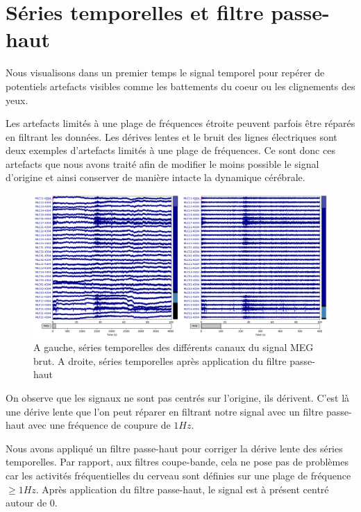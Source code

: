 \section{Séries temporelles et filtre passe-haut}

Nous visualisons dans un premier temps le signal temporel pour repérer de potentiels artefacts visibles comme les battements du coeur ou les clignements des yeux.

Les artefacts limités à une plage de fréquences étroite peuvent parfois être réparés en filtrant les données. Les dérives lentes et le bruit des lignes électriques sont deux exemples d'artefacts limités à une plage de fréquences. Ce sont donc ces artefacts que nous avons traité afin de modifier le moins possible le signal d'origine et ainsi conserver de manière intacte la dynamique cérébrale.

\begin{figure}[!ht]
    \centering
    \includegraphics[width=13cm]{series_temporelles_effet_hp.png}
    \caption{A gauche, séries temporelles des différents canaux du signal MEG brut. A droite, séries temporelles après application du filtre passe-haut}
    \label{fig3.3}
\end{figure} 

On observe que les signaux ne sont pas centrés sur l'origine, ils dérivent. C'est là une dérive lente que l'on peut réparer en filtrant notre signal avec un filtre passe-haut avec une fréquence de coupure de $1 Hz$. 

\vspace{2ex}
Nous avons appliqué un filtre passe-haut pour corriger la dérive lente des séries temporelles. Par rapport, aux filtres coupe-bande, cela ne pose pas de problèmes car les activités fréquentielles du cerveau sont définies sur une plage de fréquence $\geq 1 Hz$. Après application du filtre passe-haut, le signal est à présent centré autour de 0.

